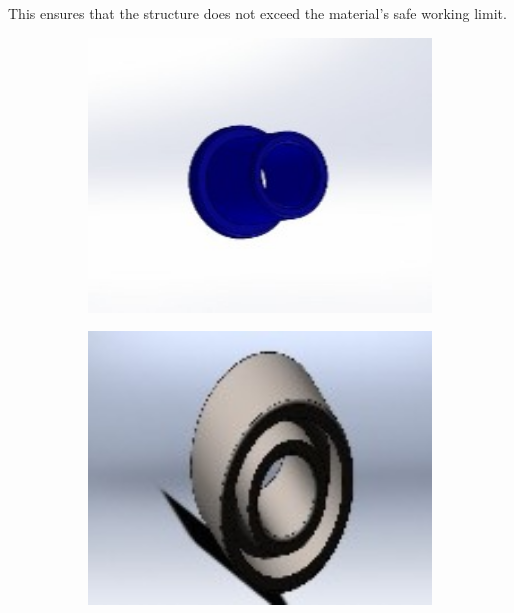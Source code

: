 \documentclass[../../main]{subfiles}
\begin{document}
This ensures that the structure does not exceed the material's safe working limit.



\begin{figure}[h]
\centering

\begin{subfigure}[b]{0.30\textwidth}
  \centering
  \includegraphics[width=1\textwidth]{img/image093.jpg}
  \caption[short]{}
  \label{a}
\end{subfigure}
\hfill
\begin{subfigure}[b]{0.30\textwidth}
  \centering
  \includegraphics[width=1\textwidth]{img/image095.jpg}

\end{subfigure}
\end{figure}
\end{document}
